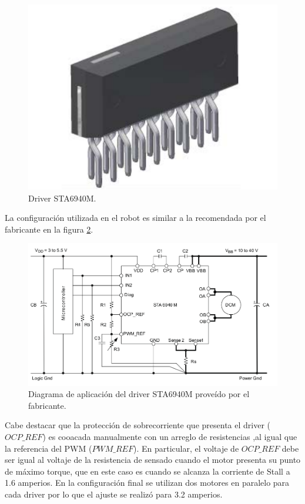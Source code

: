 \begin{figure}[H]
	\centering		\includegraphics[width=0.3\linewidth]{imagenes/prototipo/Driver}
	\caption[Driver STA6940M]{Driver STA6940M. }
	\label{imagen:Driver}
\end{figure}

La configuración utilizada en el robot es similar a la recomendada por el fabricante en la figura \ref{imagen:DriverAplicacion}.


\begin{figure}[H]
	\centering		\includegraphics[width=0.7\linewidth]{imagenes/prototipo/InformacionDeAplicacion}
	\caption[Diagrama de aplicación del driver STA6940M]{Diagrama de aplicación del driver STA6940M proveído por el fabricante.}
	\label{imagen:DriverAplicacion}
\end{figure}



Cabe destacar que la protección de sobrecorriente que presenta el driver ($OCP\_ REF$) es cooacada manualmente con un arreglo de resistencias ,al igual que la referencia del PWM ($PWM\_ REF$). En particular, el voltaje de $OCP\_ REF$ debe ser igual al voltaje de la resistencia de sensado cuando el motor presenta su punto de máximo torque, que en este caso es cuando se alcanza la corriente de Stall a 1.6 amperios. En la configuración final se utilizan dos motores en paralelo para cada driver por lo que el ajuste se realizó para 3.2 amperios.


